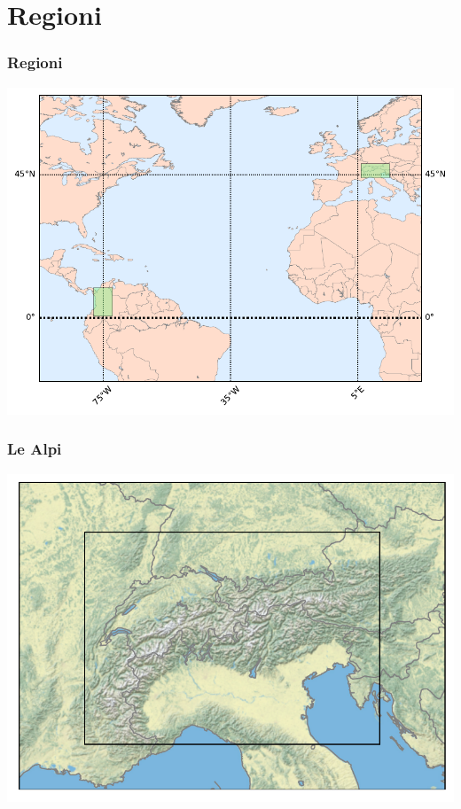 \section{Regioni}
\begin{frame} \frametitle{Regioni} \centering	 \includegraphics[width=\textwidth,height=0.9\textheight,keepaspectratio]{regions_images/regionsmap}\end{frame}

\begin{frame} \frametitle{Le Alpi} \centering \includegraphics[width=\textwidth,height=0.9\textheight,keepaspectratio]{regions_images/alpin} \end{frame}

